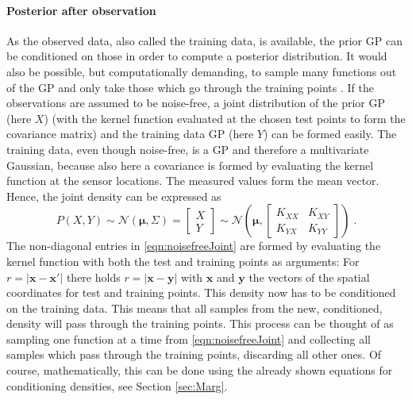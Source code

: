 \documentclass[%
  a4paper,oneside,%
  11pt,%
  smallchapters,
  style=printdev,
  extramargin,
  green,%
  rgb, <cmyk>
  ]{tubsbook}
\begin{document}
\paragraph{Posterior after observation}
\label{sec:GPcond}
As the observed data, also called the training data, is available, the prior GP can be conditioned on those in order to compute a posterior distribution. It would also be possible, but computationally demanding, to sample many functions out of the GP and only take those which go through the training points \cite[pp. 15, 16]{rasmussen2006}. If the observations are assumed to be noise-free, a joint distribution of the prior GP (here $X$) (with the kernel function evaluated at the chosen test points to form the covariance matrix) and the training data GP (here $Y$) can be formed easily. The training data, even though noise-free, is a GP and therefore a multivariate Gaussian, because also here a covariance is formed by evaluating the kernel function at the sensor locations. The measured values form the mean vector. Hence, the joint density can be expressed as
%
\begin{equation}
P(X,Y) \sim \mathcal{N}(\bm{\mu},\Sigma) = \begin{bmatrix}
           X \\
           Y
         \end{bmatrix} \sim \mathcal{N}\left( \bm{\mu}, \begin{bmatrix}
K_{XX} & K_{XY} \\
K_{YX} & K_{YY} 
\end{bmatrix}  \right) \; .
\label{eqn:noisefreeJoint}
\end{equation}
The non-diagonal entries in \eqref{eqn:noisefreeJoint} are formed by evaluating the kernel function with both the test and training points as arguments: For $r = |\bm{x}-\bm{x'}|$ there holds $r = |\bm{x} - \bm{y}|$ with $\bm{x}$ and $\bm{y}$ the vectors of the spatial coordinates for test and training points.
This density now has to be conditioned on the training data. This means that all samples from the new, conditioned, density will pass through the training points. This process can be thought of as sampling one function at a time from \eqref{eqn:noisefreeJoint} and collecting all samples which pass through the training points, discarding all other ones. Of course, mathematically, this can be done using the already shown equations for conditioning densities, see Section \ref{sec:Marg}.
\end{document}

